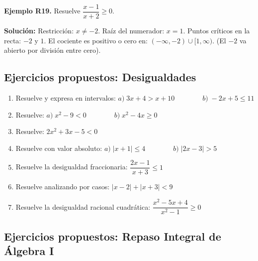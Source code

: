 \documentclass[12pt, letterpaper]{article}
\begin{document}
\textbf{Ejemplo R19.} Resuelve $\dfrac{x - 1}{x + 2} \geq 0$.

\begin{cuadrosolucion}
      \textbf{Solución:}
      Restricción: $x \neq -2$. Raíz del numerador: $x = 1$.
      Puntos críticos en la recta: $-2$ y $1$.
      El cociente es positivo o cero en: $(-\infty, -2) \cup [1, \infty)$. (El $-2$ va abierto por división entre cero).
\end{cuadrosolucion}

\subsection{Ejercicios propuestos: Desigualdades}

\begin{enumerate}[resume=ejercicios, leftmargin=*]
      \item \facil{} Resuelve y expresa en intervalos: $a)\; 3x + 4 > x + 10 \qquad\qquad b)\; -2x + 5 \le 11$

      \item \facil{} Resuelve: $a)\; x^2 - 9 < 0 \qquad\qquad b)\; x^2 - 4x \ge 0$

      \item \medio{} Resuelve: $2x^2 + 3x - 5 < 0$

      \item \medio{} Resuelve con valor absoluto: $a)\; |x + 1| \le 4 \qquad\qquad b)\; |2x - 3| > 5$

      \item \medio{} Resuelve la desigualdad fraccionaria: $\dfrac{2x - 1}{x + 3} \le 1$

      \item \dificil{} Resuelve analizando por casos: $|x - 2| + |x + 3| < 9$

      \item \dificil{} Resuelve la desigualdad racional cuadrática: $\dfrac{x^2 - 5x + 4}{x^2 - 1} \ge 0$
\end{enumerate}


\subsection{Ejercicios propuestos: Repaso Integral de Álgebra I}
\end{document}
